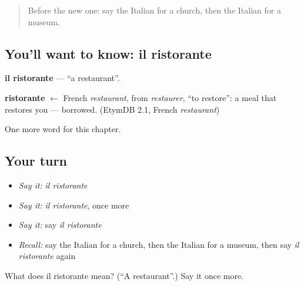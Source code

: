 \label{lesson:IT-C83-ristorante}



\begin{quote}
Before the new one: say the Italian for a church, then the Italian for a museum.
\end{quote}

\subsection*{You'll want to know: il ristorante}
\textbf{il ristorante} — \textquotedblleft{}a restaurant\textquotedblright{}.

\begin{cousinweb}
\textbf{ristorante} $\leftarrow$ French \emph{restaurant}, from \emph{restaurer}, \textquotedblleft{}to restore\textquotedblright{}: a meal that restores you — borrowed. (EtymDB 2.1, French \emph{restaurant})
\end{cousinweb}

\begin{grammarlens}[title={What you've built}]
One more word for this chapter.
\end{grammarlens}

\subsection*{Your turn}
\begin{itemize}
\raggedright
  \item \emph{Say it:} \emph{il ristorante}
  \item \emph{Say it:} \emph{il ristorante}, once more
  \item \emph{Say it:} say \emph{il ristorante}
  \item \emph{Recall:} say the Italian for a church, then the Italian for a museum, then say \emph{il ristorante} again
\end{itemize}

\begin{tcolorbox}[breakable,colback=teal!4,colframe=teal!35!black,title={Before you move on}]
What does il ristorante mean? (\textquotedblleft{}A restaurant\textquotedblright{}.) Say it once more.
\end{tcolorbox}
